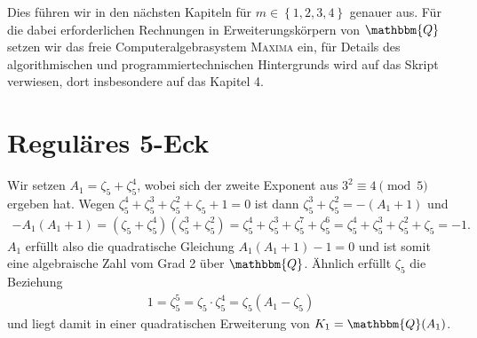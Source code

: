 \documentclass[11pt]{article}
\newcommand{\br}[1]{\ensuremath{\left(#1\right)}}
\newcommand{\cbr}[1]{\ensuremath{\left\{#1\right\}}}
\newcommand{\Q}{\mathbbm{Q}}
\begin{document}
Dies führen wir in den nächsten Kapiteln für $m\in\cbr{1,2,3,4}$ genauer aus.
Für die dabei erforderlichen Rechnungen in Erweiterungskörpern von $\Q$ setzen
wir das freie Computeralgebrasystem \textsc{Maxima} ein, für Details des 
algorithmischen und programmiertechnischen Hintergrunds wird auf das Skript
\cite{Graebe2020} verwiesen, dort insbesondere auf das Kapitel 4.

\section{Reguläres 5-Eck}

Wir setzen $A_1=\zeta_5+\zeta_5^4$, wobei sich der zweite Exponent aus
$3^2\equiv 4 \pmod{5}$ ergeben hat. Wegen
$\zeta_5^4+\zeta_5^3+\zeta_5^2+\zeta_5+1=0$ ist dann
$\zeta_5^3+\zeta_5^2=-(A_1+1)$ und
\begin{gather*}
  -A_1(A_1+1)=\br{\zeta_5+\zeta_5^4}\br{\zeta_5^3+\zeta_5^2}
  =\zeta_5^4+\zeta_5^3+\zeta_5^7+\zeta_5^6 =
  \zeta_5^4+\zeta_5^3+\zeta_5^2+\zeta_5 = -1.
\end{gather*}
$A_1$ erfüllt also die quadratische Gleichung $A_1(A_1+1)-1=0$ und ist somit
eine algebraische Zahl vom Grad 2 über $\Q$.  Ähnlich erfüllt $\zeta_5$ die
Beziehung
\begin{gather*}
  1=\zeta_5^5 = \zeta_5\cdot \zeta_5^4 = \zeta_5(A_1-\zeta_5)
\end{gather*}
und liegt damit in einer quadratischen Erweiterung von $K_1=\Q(A_1)$.
\end{document}
